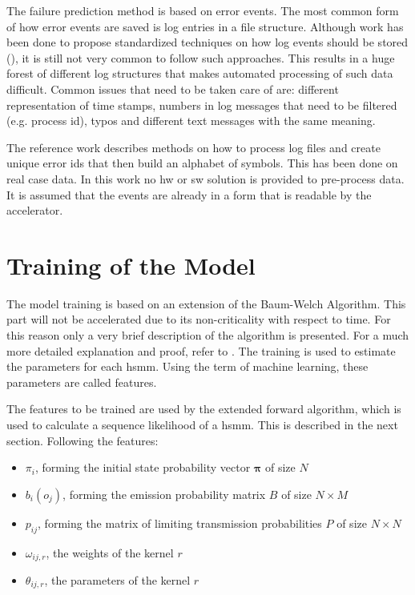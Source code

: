\documentclass[mscthesis]{usiinfthesis}
\begin{document}
The failure prediction method is based on error events. The most common form of
how error events are saved is log entries in a file structure. Although work
has been done to propose standardized techniques on how log events should be
stored (\cite{IPDPS04_Salfner, DSN09_Ziming}), it is still not very common to
follow such approaches. This results in a huge forest of different log
structures that makes automated processing of such data difficult. Common
issues that need to be taken care of are: different representation of time
stamps, numbers in log messages that need to be filtered (e.g. process id),
typos and different text messages with the same meaning.

The reference work \cite{salfner08} describes methods on how to process log
files and create unique error ids that then build an alphabet of symbols. This
has been done on real case data. In this work no \gls{hw} or \gls{sw} solution
is provided to pre-process data. It is assumed that the events are already in
a form that is readable by the accelerator.

\section{Training of the Model}
\label{ch:event_train}

The model training is based on an extension of the Baum-Welch Algorithm. This
part will not be accelerated due to its non-criticality with respect to time.
For this reason only a very brief description of the algorithm is presented.
For a much more detailed explanation and proof, refer to \cite{salfner08}.
The training is used to estimate the parameters for each \gls{hsmm}. Using
the term of machine learning, these parameters are called features.

The features to be trained are used by the extended forward algorithm, which is
used to calculate a sequence likelihood of a \gls{hsmm}. This is described in
the next section. Following the features:
\begin{itemize}
    \item $ \pi_i $, forming the initial state probability vector
        $ \boldsymbol{\pi} $ of size $ N $
    \item $ b_i(o_j) $, forming the emission probability matrix $ B $ of size
        $ N \times M $
    \item $ p_{ij} $, forming the matrix of limiting transmission probabilities
        $ P $ of size $ N \times N $
    \item $ \omega_{ij, r} $, the weights of the kernel $ r $
    \item $ \theta_{ij, r} $, the parameters of the kernel $ r $
\end{itemize}
\end{document}
